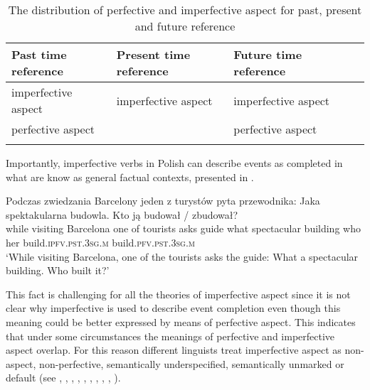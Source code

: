 \documentclass[output=paper]{langscibook}
\begin{document}
\begin{table}
\caption{The distribution of perfective and imperfective aspect for past, present and future reference}
\label{jan-bla:fansb:kb:tab1}
 \begin{tabular}{lllll}
  \lsptoprule
            Past time reference & Present time reference & Future time reference\\
  \midrule
    imperfective aspect  &    imperfective aspect     & imperfective aspect\\
    perfective aspect &     & perfective aspect\\
  \lspbottomrule
 \end{tabular}
\end{table}

Importantly, imperfective verbs in Polish can describe events as completed in what are know as general factual contexts, presented in .

\ea
\gll Podczas zwiedzania Barcelony jeden z turystów pyta przewodnika: Jaka spektakularna budowla. Kto ją budował / zbudował?\\  
     while visiting Barcelona one of tourists asks guide what spectacular building who her build.\textsc{ipfv}.\textsc{pst}.\textsc{3sg}.\textsc{m} {} build.\textsc{pfv}.\textsc{pst}.\textsc{3sg}.\textsc{m} \\
\glt ‘While visiting Barcelona, one of the tourists asks the guide: What a spectacular building. Who built it?’\label{jan-bla:fansb:kb:ex7}
\z

\noindent This fact is challenging for all the theories of imperfective aspect since it is not clear why imperfective is used to describe event completion even though this meaning could be better expressed by means of perfective aspect. This indicates that under some circumstances the meanings of perfective and imperfective aspect overlap. For this reason different linguists treat imperfective aspect as non-aspect, non-perfective, semantically underspecified, semantically unmarked or default (see \citealt{Battistella1990}, \citealt{Borik20022006}, \citealt{Comrie1976}, \citealt{Dahl1985}, \citealt{Filip19931999}, \citealt{Forsyth1970}, \citealt{Kagan2008, Kagan2010}, \citealt{Klein1995}, \citealt{PaslawskaandStechow2003}, \citealt{Willim2006}).
\end{document}
